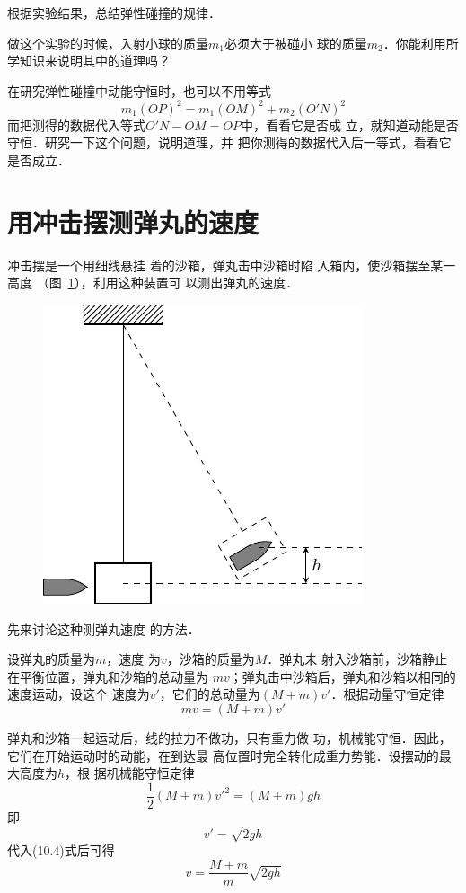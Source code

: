 根据实验结果，总结弹性碰撞的规律．

做这个实验的时候，入射小球的质量$m_1$必须大于被碰小
球的质量$m_2$．你能利用所学知识来说明其中的道理吗？

在研究弹性碰撞中动能守恒时，也可以不用等式
\[m_1(OP)^2=m_1(OM)^2+m_2(O'N)^2\]
而把测得的数据代入等式$O'N-OM=OP$中，看看它是否成
立，就知道动能是否守恒．研究一下这个问题，说明道理，并
把你测得的数据代入后一等式，看看它是否成立．


\section{用冲击摆测弹丸的速度}
冲击摆是一个用细线悬挂
着的沙箱，弹丸击中沙箱时陷
入箱内，使沙箱摆至某一高度
（图~\ref{fig_A_10-20}），利用这种装置可
以测出弹丸的速度．
\begin{figure}[htbp]
    \centering
    \includegraphics{fig/A/10-20.pdf}
    \caption{}\label{fig_A_10-20}
\end{figure}

先来讨论这种测弹丸速度
的方法．

设弹丸的质量为$m$，速度
为$v$，沙箱的质量为$M$．弹丸未
射入沙箱前，沙箱静止在平衡位置，弹丸和沙箱的总动量为
$mv$；弹丸击中沙箱后，弹丸和沙箱以相同的速度运动，设这个
速度为$v'$，它们的总动量为$(M+m)v'$．根据动量守恒定律
\begin{equation}
    mv=(M+m)v'
\end{equation}

弹丸和沙箱一起运动后，线的拉力不做功，只有重力做
功，机械能守恒．因此，它们在开始运动时的动能，在到达最
高位置时完全转化成重力势能．设摆动的最大高度为$h$，根
据机械能守恒定律
\begin{equation}
    \frac{1}{2}(M+m){v'}^2 =(M+m)gh
\end{equation}
即
\[v'=\sqrt{2gh}\]
代入(10.4)式后可得
\begin{equation}
v=\frac{M+m}{m}\sqrt{2gh}
\end{equation}

